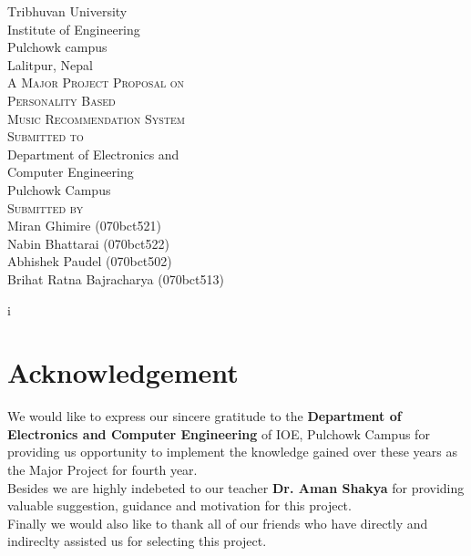 \documentclass[a4paper,12pt]{article}
\begin{document}
\begin{titlepage}
  \begin{center}
    {\Huge\textsc Tribhuvan University}\\
    [0.03in]
    {\LARGE\textsc Institute of Engineering}\\
    [0.05in]
    {\Large\textsc Pulchowk campus}\\
    [0.02in]
    {\large\textsc Lalitpur, Nepal}\\
    [2in]

    {\LARGE \textsc{A Major Project Proposal on}}\\
    [0.5cm]
    {\Large \textsc{Personality Based \\
    Music Recommendation System}}\\
    [1.8in]
    
    {\LARGE\textsc{Submitted to}}\\
    [0.05in]
    {\large Department of Electronics and }\\
    {\large Computer Engineering}\\
    {\large Pulchowk Campus}\\
    [1in]

    {\LARGE \textsc{\large Submitted by}}\\
    [0.05in]
    {\large Miran Ghimire (070bct521)}\\
    [0.05in]
    {\large Nabin Bhattarai (070bct522)}\\
    [0.05in]
    {\large Abhishek Paudel (070bct502)}\\
    [0.05in]
    {\large Brihat Ratna Bajracharya (070bct513)}\\
    [0.05in]
  \end{center}
i\end{titlepage}

\setcounter{page}{2}

\section*{Acknowledgement}
	We would like to express our sincere gratitude to the \textbf{Department of Electronics and Computer Engineering }of IOE, Pulchowk Campus for providing us opportunity to implement the knowledge gained over these years as the Major Project for fourth year.\\ 
	Besides we are highly indebeted to our teacher \textbf{Dr. Aman Shakya} for providing valuable suggestion, guidance and motivation for this project.\\
Finally we would also like to thank all of our friends who have directly and indireclty assisted us for selecting this project.
\cleardoublepage
\end{document}
